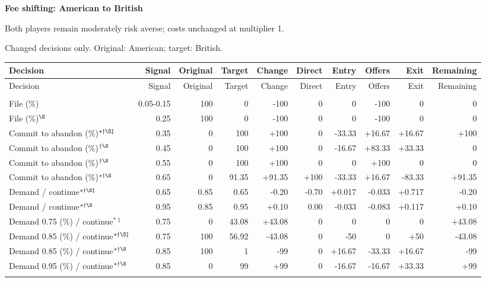 \documentclass[10pt]{article}
\begin{document}
{\large\bfseries Fee shifting: American to British}\par
Both players remain moderately risk averse; costs unchanged at multiplier 1.\par
{\small Changed decisions only. Original: American; target: British.}\par
{\small\setlength{\tabcolsep}{3pt}\begin{longtable}{@{}>{\raggedright\arraybackslash}p{1.65in}rrrrrrrrr@{}}
\toprule Decision & Signal & Original & Target & Change & Direct & Entry & Offers & Exit & Remaining \\\midrule\endfirsthead
\toprule Decision & Signal & Original & Target & Change & Direct & Entry & Offers & Exit & Remaining \\\midrule\endhead
\bottomrule\endfoot
\multicolumn{10}{@{}l}{\textbf{Plaintiff}}\\
File (\%) & 0.05-0.15 & 100 & 0 & -100 & 0 & 0 & -100 & 0 & 0\\
File (\%)$^{\S}$ & 0.25 & 100 & 0 & -100 & 0 & 0 & -100 & 0 & 0\\
Commit to abandon (\%)$^{*\dagger\S\ddagger}$ & 0.35 & 0 & 100 & +100 & 0 & -33.33 & +16.67 & +16.67 & +100\\
Commit to abandon (\%)$^{\dagger\S}$ & 0.45 & 0 & 100 & +100 & 0 & -16.67 & +83.33 & +33.33 & 0\\
Commit to abandon (\%)$^{\dagger\S}$ & 0.55 & 0 & 100 & +100 & 0 & 0 & +100 & 0 & 0\\
Commit to abandon (\%)$^{*\dagger\S}$ & 0.65 & 0 & 91.35 & +91.35 & +100 & -33.33 & +16.67 & -83.33 & +91.35\\
Demand / continue$^{*\dagger\S\ddagger}$ & 0.65 & 0.85 & 0.65 & -0.20 & -0.70 & +0.017 & -0.033 & +0.717 & -0.20\\
Demand / continue$^{*\dagger\S}$ & 0.95 & 0.85 & 0.95 & +0.10 & 0.00 & -0.033 & -0.083 & +0.117 & +0.10\\
Demand 0.75 (\%) / continue$^{*\ddagger}$ & 0.75 & 0 & 43.08 & +43.08 & 0 & 0 & 0 & 0 & +43.08\\
Demand 0.85 (\%) / continue$^{*\dagger\S\ddagger}$ & 0.75 & 100 & 56.92 & -43.08 & 0 & -50 & 0 & +50 & -43.08\\
Demand 0.85 (\%) / continue$^{*\dagger\S}$ & 0.85 & 100 & 1 & -99 & 0 & +16.67 & -33.33 & +16.67 & -99\\
Demand 0.95 (\%) / continue$^{*\dagger\S}$ & 0.85 & 0 & 99 & +99 & 0 & -16.67 & -16.67 & +33.33 & +99\\
\multicolumn{10}{@{}l}{\textbf{Defendant}}\\

\end{longtable}}
\end{document}
